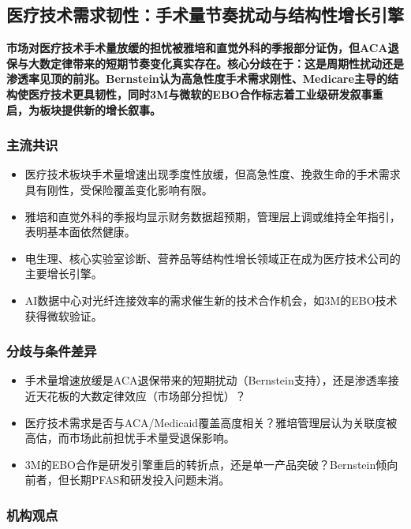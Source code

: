 \documentclass[11pt]{ctexart}
\begin{document}
\subsection{医疗技术需求韧性：手术量节奏扰动与结构性增长引擎}
\textbf{市场对医疗技术手术量放缓的担忧被雅培和直觉外科的季报部分证伪，但ACA退保与大数定律带来的短期节奏变化真实存在。核心分歧在于：这是周期性扰动还是渗透率见顶的前兆。Bernstein认为高急性度手术需求刚性、Medicare主导的结构使医疗技术更具韧性，同时3M与微软的EBO合作标志着工业级研发叙事重启，为板块提供新的增长叙事。}
\subsubsection*{主流共识}
\begin{itemize}
  \item 医疗技术板块手术量增速出现季度性放缓，但高急性度、挽救生命的手术需求具有刚性，受保险覆盖变化影响有限。
  \item 雅培和直觉外科的季报均显示财务数据超预期，管理层上调或维持全年指引，表明基本面依然健康。
  \item 电生理、核心实验室诊断、营养品等结构性增长领域正在成为医疗技术公司的主要增长引擎。
  \item AI数据中心对光纤连接效率的需求催生新的技术合作机会，如3M的EBO技术获得微软验证。
\end{itemize}
\subsubsection*{分歧与条件差异}
\begin{itemize}
  \item 手术量增速放缓是ACA退保带来的短期扰动（Bernstein支持），还是渗透率接近天花板的大数定律效应（市场部分担忧）？
  \item 医疗技术需求是否与ACA/Medicaid覆盖高度相关？雅培管理层认为关联度被高估，而市场此前担忧手术量受退保影响。
  \item 3M的EBO合作是研发引擎重启的转折点，还是单一产品突破？Bernstein倾向前者，但长期PFAS和研发投入问题未消。
\end{itemize}
\subsubsection*{机构观点}
\end{document}
